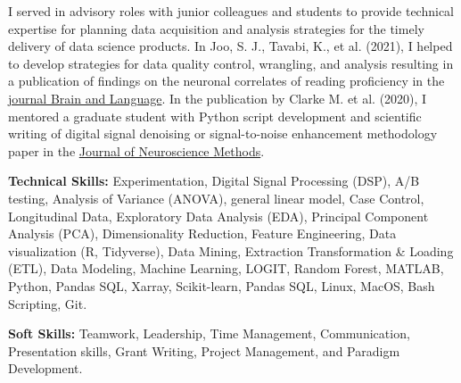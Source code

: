 \begin{cventries}
{\begin{cvitems}
      \item {I served in advisory roles with junior colleagues and students to provide technical expertise for planning data acquisition and analysis strategies for the timely delivery of data science products. In Joo, S. J., Tavabi, K., et al. (2021), I helped to develop strategies for data quality control, wrangling, and analysis resulting in a publication of findings on the neuronal correlates of reading proficiency in the \href{https://doi.org/10.1016/j.bandl.2020.104906}{journal Brain and Language}. In the publication by Clarke M. et al. (2020), I mentored a graduate student with Python script development and scientific writing of digital signal denoising or signal-to-noise enhancement methodology paper in the \href{https://doi.org/10.1016/j.jneumeth.2020.108700}{Journal of Neuroscience Methods}.}
      \item {\textbf{Technical Skills:} Experimentation, Digital Signal Processing (DSP), A/B testing, Analysis of Variance (ANOVA), general linear model, Case Control, Longitudinal Data, Exploratory Data Analysis (EDA), Principal Component Analysis (PCA), Dimensionality Reduction, Feature Engineering, Data visualization (R, Tidyverse), Data Mining, Extraction Transformation \& Loading (ETL), Data Modeling, Machine Learning, LOGIT, Random Forest, MATLAB, Python, Pandas SQL, Xarray, Scikit-learn, Pandas SQL, Linux, MacOS, Bash Scripting, Git.}
      \item {\textbf{Soft Skills:} Teamwork, Leadership, Time Management, Communication, Presentation skills, Grant Writing, Project Management, and Paradigm Development.}
    \end{cvitems}
  }


\end{cventries}
